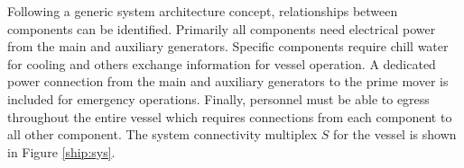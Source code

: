 \documentclass[preprint,12pt]{elsarticle}
\begin{document}
Following a generic system architecture concept, relationships between components can be identified. Primarily all components need electrical power from the main and auxiliary generators. Specific components require chill water for cooling and others exchange information for vessel operation. A dedicated power connection from the main and auxiliary generators to the prime mover is included for emergency operations. Finally, personnel must be able to egress throughout the entire vessel which requires connections from each component to all other component. The system connectivity multiplex $S$ for the vessel is shown in Figure \ref{ship:sys}.

\end{document}
